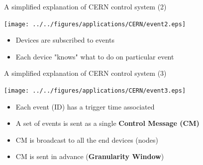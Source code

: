 \documentclass[compress,red]{beamer}
\begin{document}
\begin{frame}{A simplified explanation of CERN control system (2)}

      \begin{center}
      \texttt{[image: ../../figures/applications/CERN/event2.eps]}
      \end{center}

  \begin{itemize}
    \item Devices are subscribed to events 
    \item Each device "knows" what to do on particular event
  \end{itemize}


\end{frame}


\begin{frame}{A simplified explanation of CERN control system (3)}

      \begin{center}
      \texttt{[image: ../../figures/applications/CERN/event3.eps]}
      \end{center}

  \begin{itemize}
    \item Each event (ID) has a trigger time associated
	\item A set of events is sent as a single {\bf Control Message (CM)}
	\item CM is broadcast to all the end devices (nodes)
	\item CM is sent in advance ({\bf Granularity Window})
  \end{itemize}

\end{frame}
\end{document}

